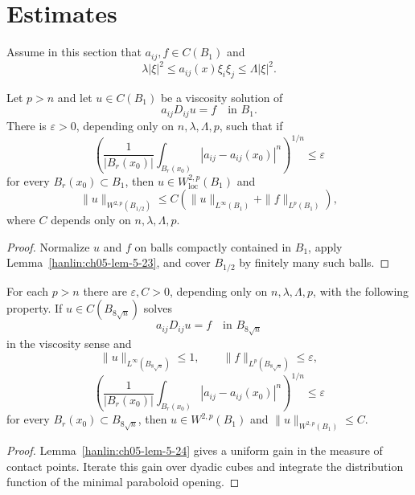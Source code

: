 \section{\Wtwop Estimates}

Assume in this section that $a_{ij},f\in C(B_1)$ and
\[
\lambda|\xi|^2\leq a_{ij}(x)\xi_i\xi_j\leq\Lambda|\xi|^2.
\]

\begin{theorem}\label{hanlin:ch05-thm-5-22}
Let $p>n$ and let $u\in C(B_1)$ be a viscosity solution of
\[
a_{ij}D_{ij}u=f\quad\text{in }B_1.
\]
There is $\varepsilon>0$, depending only on $n,\lambda,\Lambda,p$, such
that if
\[
\left(\frac1{|B_r(x_0)|}\int_{B_r(x_0)}
|a_{ij}-a_{ij}(x_0)|^n\right)^{1/n}\leq\varepsilon
\]
for every $B_r(x_0)\subset B_1$, then $u\in W^{2,p}_{\mathrm{loc}}(B_1)$
and
\[
\|u\|_{W^{2,p}(B_{1/2})}
\leq C\left(\|u\|_{L^\infty(B_1)}+\|f\|_{L^p(B_1)}\right),
\]
where $C$ depends only on $n,\lambda,\Lambda,p$.
\end{theorem}
\begin{proof}
\sketch Normalize $u$ and $f$ on balls compactly contained in $B_1$,
apply Lemma~\ref{hanlin:ch05-lem-5-23}, and cover $B_{1/2}$ by finitely
many such balls.
\end{proof}

\begin{lemma}\label{hanlin:ch05-lem-5-23}
For each $p>n$ there are $\varepsilon,C>0$, depending only on
$n,\lambda,\Lambda,p$, with the following property. If
$u\in C(B_{8\sqrt n})$ solves
\[
a_{ij}D_{ij}u=f\quad\text{in }B_{8\sqrt n}
\]
in the viscosity sense and
\[
\|u\|_{L^\infty(B_{8\sqrt n})}\leq1,\qquad
\|f\|_{L^p(B_{8\sqrt n})}\leq\varepsilon,
\]
\[
\left(\frac1{|B_r(x_0)|}\int_{B_r(x_0)}
|a_{ij}-a_{ij}(x_0)|^n\right)^{1/n}\leq\varepsilon
\]
for every $B_r(x_0)\subset B_{8\sqrt n}$, then
$u\in W^{2,p}(B_1)$ and $\|u\|_{W^{2,p}(B_1)}\leq C$.
\end{lemma}

\begin{proof}
\sketch Lemma~\ref{hanlin:ch05-lem-5-24} gives a uniform gain in the
measure of contact points. Iterate this gain over dyadic cubes and integrate
the distribution function of the minimal paraboloid opening.
\end{proof}

